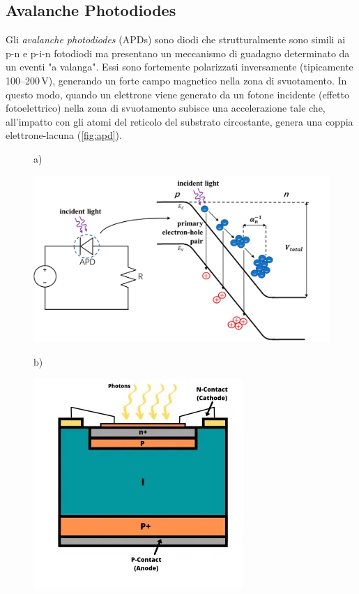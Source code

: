 \subsection{Avalanche Photodiodes}
Gli \textit{avalanche photodiodes} (APDs) sono diodi che strutturalmente sono simili ai p-n e p-i-n fotodiodi ma presentano un meccanismo di guadagno determinato da un eventi "a valanga". Essi sono fortemente polarizzati inversamente (tipicamente \numrange[range-phrase=--]{100}{200}\,\unit{\volt}), generando un forte campo magnetico nella zona di svuotamento. In questo modo, quando un elettrone viene generato da un fotone incidente (effetto fotoelettrico) nella zona di svuotamento subisce una accelerazione tale che, all'impatto con gli atomi del reticolo del substrato circostante, genera una coppia elettrone-lacuna (\Fig\ref{fig:apd}). 
\begin{figure}[tbh]
	\centering
	a)
	\begin{minipage}{.45\textwidth}
		\includegraphics[width=\linewidth]{./ImageFiles/APD.jpg}
	\end{minipage}
	b)
	\begin{minipage}{.45\textwidth}
		\includegraphics[width=\linewidth]{./ImageFiles/apd_2D.jpg}

\end{minipage}
\end{figure}
